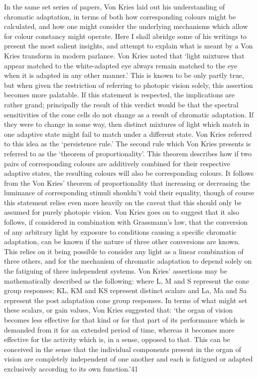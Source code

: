 In the same set series of papers, Von Kries laid out his understanding of chromatic adaptation, in terms of both how corresponding colours might be calculated, and how one might consider the underlying mechanisms which allow for colour constancy might operate. Here I shall abridge some of his writings to present the most salient insights, and attempt to explain what is meant by a Von Kries transform in modern parlance.
Von Kries noted that `light mixtures that appear matched to the white-adapted eye always remain matched to the eye when it is adapted in any other manner.' This is known to be only partly true, but when given the restriction of referring to photopic vision solely, this assertion becomes more palatable. If this statement is respected, the implications are rather grand; principally the result of this verdict would be that the spectral sensitivities of the cone cells do not change as a result of chromatic adaptation. If they were to change in some way, then distinct mixtures of light which match in one adaptive state might fail to match under a different state. Von Kries referred to this idea as the `persistence rule.'
The second rule which Von Kries presents is referred to as the `theorem of proportionality'. This theorem describes how if two pairs of corresponding colours are additively combined for their respective adaptive states, the resulting colours will also be corresponding colours. 
It follows from the Von Kries' theorem of proportionality that increasing or decreasing the luminance of corresponding stimuli shouldn't void their equality, though of course this statement relies even more heavily on the caveat that this should only be assumed for purely photopic vision.
Von Kries goes on to suggest that it also follows, if considered in combination with Grassmann's law, that the conversion of any arbitrary light by exposure to conditions causing a specific chromatic adaptation, can be known if the nature of three other conversions are known. This relies on it being possible to consider any light as a linear combination of three others, and for the mechanism of chromatic adaptation to depend solely on the fatiguing of three independent systems.
Von Kries' assertions may be mathematically described as the following:
where L, M and S represent the cone group responses; KL, KM and KS represent distinct scalars and La, Ma and Sa represent the post adaptation cone group responses.
In terms of what might set these scalars, or gain values, Von Kries suggested that: 
`the organ of vision becomes less effective for that kind or for that part of its performance which is demanded from it for an extended period of time, whereas it becomes more effective for the activity which is, in a sense, opposed to that. This can be conceived in the sense that the individual components present in the organ of vision are completely independent of one another and each is fatigued or adapted exclusively according to its own function.'41

